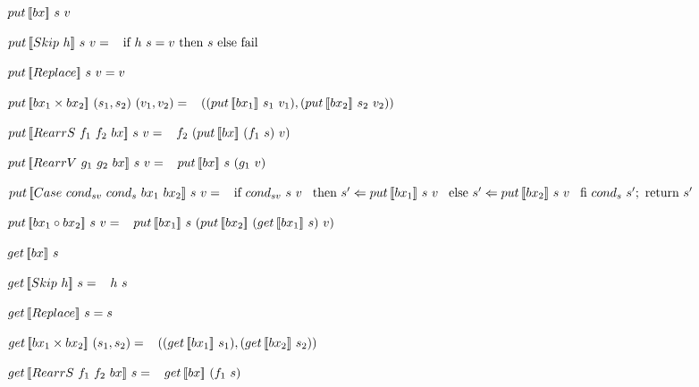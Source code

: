 \begin{multicols}{2}
    \begin{definition}
        $put \, [\![bx]\!] \ s \ v$

        \noindent $put \, [\![Skip \ h]\!] \ s \ v = \\
            \hspace*{3mm} \text{if } h \ s = v \text{ then } s \text{ else } \text{fail}$
    
        \noindent $put \, [\![Replace]\!] \ s \ v = v$
    
        \noindent $put \, [\![bx_1 \times bx_2]\!] \ (s_1, s_2) \ (v_1, v_2) = \\
            \hspace*{3mm} ((put \, [\![bx_1]\!] \ s_1 \ v_1),(put \, [\![bx_2]\!] \ s_2 \ v_2))$
    
        \noindent $put \, [\![RearrS \ f_1 \ f_2 \ bx]\!] \ s \ v = \\
            \hspace*{3mm} f_2 \ (put \, [\![bx]\!] \ (f_1 \ s) \ v)$
    
        \noindent $put \, [\![RearrV \ g_1 \ g_2 \ bx]\!] \ s \ v = \\
            \hspace*{3mm} put \, [\![bx]\!] \ s \ (g_1 \ v)$
    
        \noindent $\putbx{\casebx{cond_{sv}}{cond_{s}}{bx_1}{bx_2}}{s}{v} =\\
            \tab \text{if} \ {cond_{sv} \ s \ v} \\
            \tab \text{then} \ s' \Leftarrow \putbx{bx_1}{s}{v} \\
            \tab \text{else} \ s' \Leftarrow \putbx{bx_2}{s}{v} \\
            \tab \text{fi} \ cond_{s} \ s'; \ \text{return} \ s'$
    
        \noindent $\putbx{bx_1 \circ bx_2}{s}{v} = \\
            \tab \putbx{bx_1}{s}{(\putbx{bx_2}{(\getbx{bx_1}{s})}{v})}$
    \end{definition}
\columnbreak
    \begin{definition}
        $get \, [\![bx]\!] \ s$

        \noindent $get \, [\![Skip \ h]\!] \ s = \\ 
            \hspace*{3mm} h \ s$

        \noindent $get \, [\![Replace]\!] \ s = s$

        \noindent $get \, [\![bx_1 \times bx_2]\!] \ (s_1,s_2) = \\
            \hspace*{3mm} ((get \, [\![bx_1]\!] \ s_1),(get \, [\![bx_2]\!] \ s_2))$

        \noindent $get \, [\![RearrS \ f_1 \ f_2 \ bx]\!] \ s = \\ 
            \hspace*{3mm} get \, [\![bx]\!] \ (f_1 \ s)$


\end{definition}
\end{multicols}
